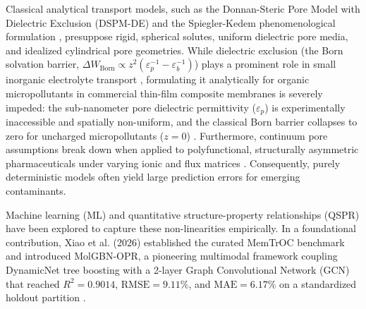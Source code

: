 \documentclass[11pt]{article}
\newcommand{\rsq}{R^{2}}
\begin{document}
Classical analytical transport models, such as the Donnan-Steric Pore Model with Dielectric Exclusion (DSPM-DE) \cite{bowen2002,bandini2003} and the Spiegler-Kedem phenomenological formulation \cite{spiegler1966,kedem1958}, presuppose rigid, spherical solutes, uniform dielectric pore media, and idealized cylindrical pore geometries. While dielectric exclusion (the Born solvation barrier, $\Delta W_{\mathrm{Born}} \propto z^2(\varepsilon_p^{-1} - \varepsilon_b^{-1})$) plays a prominent role in small inorganic electrolyte transport \cite{bandini2003}, formulating it analytically for organic micropollutants in commercial thin-film composite membranes is severely impeded: the sub-nanometer pore dielectric permittivity ($\varepsilon_p$) is experimentally inaccessible and spatially non-uniform, and the classical Born barrier collapses to zero for uncharged micropollutants ($z=0$) \cite{xu2024}. Furthermore, continuum pore assumptions break down when applied to polyfunctional, structurally asymmetric pharmaceuticals under varying ionic and flux matrices \cite{xu2024}. Consequently, purely deterministic models often yield large prediction errors for emerging contaminants.

Machine learning (ML) and quantitative structure-property relationships (QSPR) have been explored to capture these non-linearities empirically. In a foundational contribution, Xiao et al. (2026) established the curated MemTrOC benchmark and introduced MolGBN-OPR, a pioneering multimodal framework coupling DynamicNet tree boosting with a 2-layer Graph Convolutional Network (GCN) that reached $\rsq = 0.9014$, $\mathrm{RMSE} = 9.11\%$, and $\mathrm{MAE} = 6.17\%$ on a standardized holdout partition \cite{xiao2026}.
\end{document}

